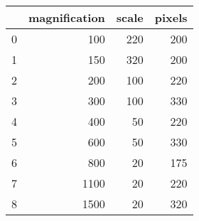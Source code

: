 \begin{tabular}{lrrr}
\toprule
{} &  magnification &  scale &  pixels \\
\midrule
0 &            100 &    220 &     200 \\
1 &            150 &    320 &     200 \\
2 &            200 &    100 &     220 \\
3 &            300 &    100 &     330 \\
4 &            400 &     50 &     220 \\
5 &            600 &     50 &     330 \\
6 &            800 &     20 &     175 \\
7 &           1100 &     20 &     220 \\
8 &           1500 &     20 &     320 \\
\bottomrule
\end{tabular}
